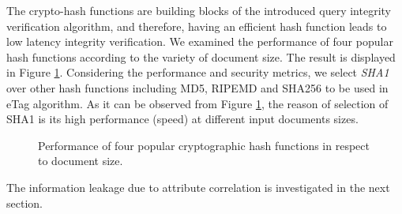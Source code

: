 The crypto-hash functions are building blocks of the introduced query integrity verification algorithm, and therefore, having an efficient hash function leads to low latency integrity verification. We examined the performance of four popular hash functions according to the variety of document size. The result is displayed in Figure \ref{fig:hashPerformance}. Considering the performance and security metrics, we select \emph{SHA1} over other hash functions including MD5, RIPEMD and SHA256 to be used in eTag algorithm. As it can be observed from Figure \ref{fig:hashPerformance}, the reason of selection of SHA1 is its high performance (speed) at different input documents sizes.

\begin{figure}[H]
\centering
\resizebox{0.6\textwidth}{!}{}
\caption{Performance of four popular cryptographic hash functions in respect to document size.}
\label{fig:hashPerformance}
\end{figure}

\noindent The information leakage due to attribute correlation is investigated in the next section.
